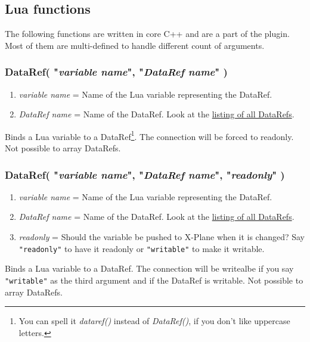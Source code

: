 \documentclass[11pt,parskip=half,a4paper]{scrartcl}
\begin{document}
\newpage
\subsection{Lua functions}

The following functions are written in core C++ and are a part of the plugin. Most of them are multi-defined to handle different count of arguments.

\subsubsection{DataRef( "\emph{variable name}", "\emph{DataRef name}" )}

\begin{enumerate}
	\item \emph{variable name} = Name of the Lua variable representing the DataRef.
	\item \emph{DataRef name} = Name of the DataRef. Look at the \href{http://www.xsquawkbox.net/xpsdk/docs/DataRefs.html}{listing of all DataRefs}.
\end{enumerate}

Binds a Lua variable to a DataRef\footnote{You can spell it \emph{dataref()} instead of \emph{DataRef()}, if you don't like uppercase letters.}. The connection will be forced to readonly. Not possible to array DataRefs.

\subsubsection{DataRef( "\emph{variable name}", "\emph{DataRef name}", "\emph{readonly}" )}

\begin{enumerate}
	\item \emph{variable name} = Name of the Lua variable representing the DataRef.
	\item \emph{DataRef name} = Name of the DataRef. Look at the \href{http://www.xsquawkbox.net/xpsdk/docs/DataRefs.html}{listing of all DataRefs}.
	\item \emph{readonly} = Should the variable be pushed to X-Plane when it is changed? Say \verb|"readonly"| to have it readonly or \verb|"writable"| to make it writable.
\end{enumerate}

Binds a Lua variable to a DataRef. The connection will be writealbe if you say \verb|"writable"| as the third argument and if the DataRef is writable. Not possible to array DataRefs.
\end{document}
